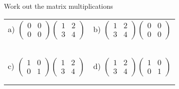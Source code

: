 \documentclass[fontsize=12pt]{scrartcl}
\begin{document}
\newpage
Work out the matrix multiplications
\newline
\newline
\begin{tabular}{p{9cm}p{9cm}}
a) $\begin{pmatrix}0&0\\0&0\end{pmatrix}\begin{pmatrix}1&2\\3&4\end{pmatrix}$
&b) $\begin{pmatrix}1&2\\3&4\end{pmatrix}\begin{pmatrix}0&0\\0&0\end{pmatrix}$
\\\\\\
\\\\\\

c) $\begin{pmatrix}1&0\\0&1\end{pmatrix}\begin{pmatrix}1&2\\3&4\end{pmatrix}$
&d) $\begin{pmatrix}1&2\\3&4\end{pmatrix}\begin{pmatrix}1&0\\0&1\end{pmatrix}$
\\\\\\

\end{tabular}
\end{document}
